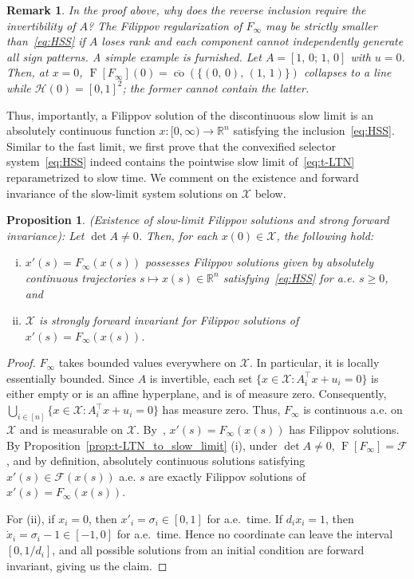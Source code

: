 \documentclass[letterpaper, conference]{ieeeconf}
\newcommand{\R}{\mathbb R}
\newcommand{\X}{\mathcal X}
\newtheorem{remark}[theorem]{Remark}
\newtheorem{proposition}[theorem]{Proposition}
\newcommand{\longthmtitle}[1]{\mbox{}{\textit{(#1):}}}
\newcommand{\1}{\mathbf{1}}
\newcommand{\mc}{\mathcal}
\begin{document}
\begin{remark}
    In the proof above, why does the reverse inclusion require the invertibility of \(A\)? 
    The Filippov regularization of \(F_\infty\) may be strictly smaller than~\eqref{eq:HSS} if \(A\) loses rank and each component cannot independently generate all sign patterns.
    A simple example is furnished.
    Let \(A = [1,\,0;\, 1,\, 0]\) with \(u=0\). Then, at \(x=0\), \(\operatorname{F}[F_\infty](0) = \overline{\operatorname{co}}(\{(0,\,0),\, (1,\,1)\})\) collapses to a line while \(\mc H(0) = [0,1]^2\); the former cannot contain the latter.
\end{remark}

Thus, importantly, a Filippov solution of the discontinuous slow limit is an absolutely continuous function \(x:[0,\infty) \rightarrow \R^n\) satisfying the inclusion~\eqref{eq:HSS}.
Similar to the fast limit, we first prove that the convexified selector system~\eqref{eq:HSS} indeed contains the pointwise slow limit of~\eqref{eq:t-LTN} reparametrized to slow time.
We comment on the existence and forward invariance of the slow-limit system solutions on \(\X\) below.
\begin{proposition}\longthmtitle{Existence of slow-limit Filippov solutions and strong forward invariance}
\label{prop:slow_existence_invariance}
Let \(\det A \neq 0\). 
Then, for each \(x(0) \in \X\), the following hold:
\begin{enumerate}[(i)]
    \item \(x'(s) = F_\infty(x(s))\) possesses Filippov solutions given by absolutely continuous trajectories \(s\mapsto x(s)\in \R^n\) satisfying~\eqref{eq:HSS} for a.e. \(s\geq 0\), and
    \item \(\X\) is strongly forward invariant for Filippov solutions of \(x'(s) = F_\infty(x(s))\).
\end{enumerate}
\end{proposition}
\begin{proof} 
\(F_\infty\) takes bounded values everywhere on \(\X\). 
In particular, it is locally essentially bounded.
Since \(A\) is invertible, each set \(\{x \in \X :A_i^\top x + u_i= 0\}\) is either empty or is an affine hyperplane, and is of measure zero. 
Consequently, \(\bigcup_{i\in[n]}\{x \in \X :A_i^\top x + u_i= 0\}\) has measure zero.
Thus, \(F_\infty\) is continuous a.e. on \(\X\) and is measurable on \(\X\).
By~\cite[Proposition 3]{JC:08}, \(x'(s) = F_\infty(x(s))\) has Filippov solutions.
By Proposition~\ref{prop:t-LTN_to_slow_limit} (i), under \(\det A \neq 0\), \(\operatorname{F}[F_\infty] = \mc F\), and by definition, absolutely continuous solutions satisfying \(x'(s) \in \mc F(x(s))\) a.e. \(s\) are exactly Filippov solutions of \(x'(s) = F_\infty(x(s))\).

For (ii), if \(x_i=0\), then \(x'_i=\sigma_i\in[0,1]\) for a.e.\ time. If \(d_i x_i=1\), then
\(\dot x_i=\sigma_i-1\in[-1,0]\)
for a.e.\ time. Hence no coordinate can leave the interval \([0,1/d_i]\), and all possible solutions from an initial condition are forward invariant, giving us the claim.
\end{proof}
\end{document}
